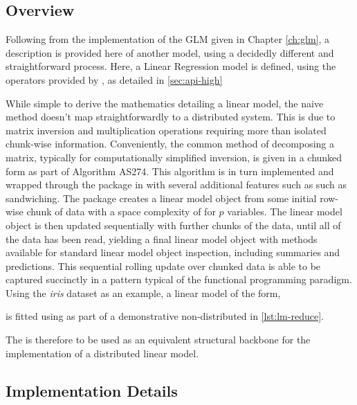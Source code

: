 \subsection{Overview}

Following from the implementation of the GLM given in Chapter \cref{ch:glm}, a description is provided here of another model, using a decidedly different and straightforward process.
Here, a Linear Regression model is defined, using the operators provided by \lso{}, as detailed in \cref{sec:api-high}

While simple to derive the mathematics detailing a linear model, the naive method doesn't map straightforwardly to a distributed system.
This is due to matrix inversion and multiplication operations requiring more than isolated chunk-wise information.
Conveniently, the common method of decomposing a matrix, typically for computationally simplified inversion, is given in a chunked form as part of Algorithm AS274\cite{miller1992as274}.
This algorithm is in turn implemented and wrapped through the  package in \R{} with several additional features such as such as sandwiching\cite{lumley2013biglm}.
The  package creates a linear model object from some initial row-wise chunk of data with a space complexity of  for $p$ variables.
The linear model object is then updated sequentially with further chunks of the data, until all of the data has been read, yielding a final linear model object with methods available for standard linear model object inspection, including summaries and predictions.
This sequential rolling update over chunked data is able to be captured succinctly in a  pattern typical of the functional programming paradigm.
Using the \textit{iris} dataset as an example, a linear model of the form, 


is fitted using  as part of a demonstrative non-distributed  in \cref{lst:lm-reduce}.


The  is therefore to be used as an equivalent structural backbone for the implementation of a distributed linear model.

\subsection{Implementation Details}

